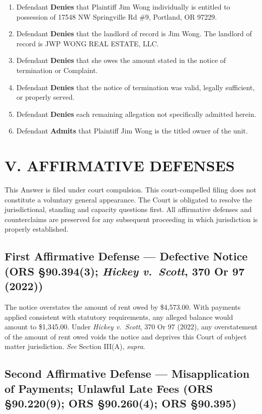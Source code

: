 \documentclass[12pt,letterpaper]{article}
\begin{document}
\begin{enumerate}
  \item Defendant \textbf{Denies} that Plaintiff Jim Wong individually is entitled to possession of 17548 NW Springville Rd \#9, Portland, OR 97229.
  \item Defendant \textbf{Denies} that the landlord of record is Jim Wong. The landlord of record is JWP WONG REAL ESTATE, LLC.
  \item Defendant \textbf{Denies} that she owes the amount stated in the notice of termination or Complaint.
  \item Defendant \textbf{Denies} that the notice of termination was valid, legally sufficient, or properly served.
  \item Defendant \textbf{Denies} each remaining allegation not specifically admitted herein.
  \item Defendant \textbf{Admits} that Plaintiff Jim Wong is the titled owner of the unit.
\end{enumerate}

\section*{V. AFFIRMATIVE DEFENSES}

This Answer is filed under court compulsion. This court-compelled filing does not constitute a voluntary general appearance. The Court is obligated to resolve the jurisdictional, standing and capacity questions first. All affirmative defenses and counterclaims are preserved for any subsequent proceeding in which jurisdiction is properly established.

\subsection{First Affirmative Defense --- Defective Notice (ORS \S90.394(3); \textit{Hickey v.\ Scott}, 370 Or 97 (2022))}

The notice overstates the amount of rent owed by \$4,573.00. With payments applied consistent with statutory requirements, any alleged balance would amount to \$1,345.00. Under \textit{Hickey v.\ Scott}, 370 Or 97 (2022), any overstatement of the amount of rent owed voids the notice and deprives this Court of subject matter jurisdiction. \textit{See} Section III(A), \textit{supra}.

\subsection{Second Affirmative Defense --- Misapplication of Payments; Unlawful Late Fees (ORS \S90.220(9); ORS \S90.260(4); ORS \S90.395)}
\end{document}
